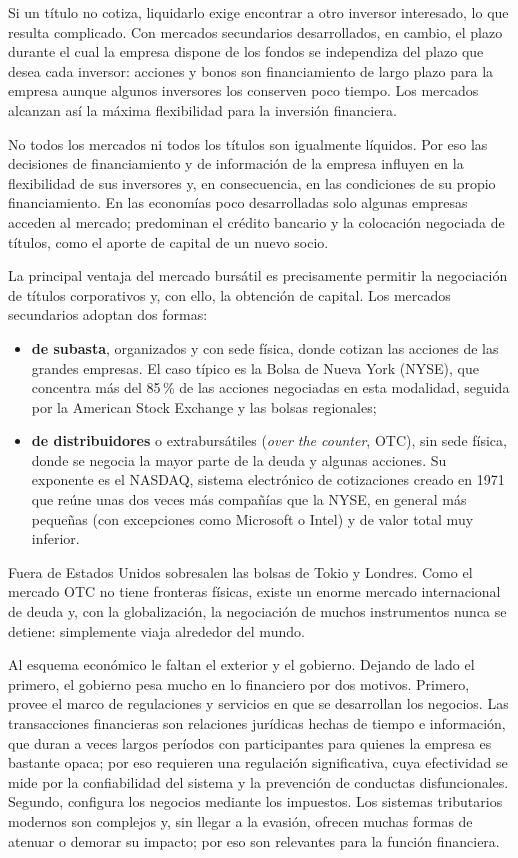 Si un título no cotiza, liquidarlo exige encontrar a otro inversor interesado, lo que resulta complicado. Con mercados secundarios desarrollados, en cambio, el plazo durante el cual la empresa dispone de los fondos se independiza del plazo que desea cada inversor: acciones y bonos son financiamiento de largo plazo para la empresa aunque algunos inversores los conserven poco tiempo. Los mercados alcanzan así la máxima flexibilidad para la inversión financiera.

No todos los mercados ni todos los títulos son igualmente líquidos. Por eso las decisiones de financiamiento y de información de la empresa influyen en la flexibilidad de sus inversores y, en consecuencia, en las condiciones de su propio financiamiento. En las economías poco desarrolladas solo algunas empresas acceden al mercado; predominan el crédito bancario y la colocación negociada de títulos, como el aporte de capital de un nuevo socio.

La principal ventaja del mercado bursátil es precisamente permitir la negociación de títulos corporativos y, con ello, la obtención de capital. Los mercados secundarios adoptan dos formas:
\begin{itemize}
\item \textbf{de subasta}, organizados y con sede física, donde cotizan las acciones de las grandes empresas. El caso típico es la Bolsa de Nueva York (NYSE), que concentra más del 85\,\% de las acciones negociadas en esta modalidad, seguida por la American Stock Exchange y las bolsas regionales;
\item \textbf{de distribuidores} o extrabursátiles (\emph{over the counter}, OTC), sin sede física, donde se negocia la mayor parte de la deuda y algunas acciones. Su exponente es el NASDAQ, sistema electrónico de cotizaciones creado en 1971 que reúne unas dos veces más compañías que la NYSE, en general más pequeñas (con excepciones como Microsoft o Intel) y de valor total muy inferior.
\end{itemize}
Fuera de Estados Unidos sobresalen las bolsas de Tokio y Londres. Como el mercado OTC no tiene fronteras físicas, existe un enorme mercado internacional de deuda y, con la globalización, la negociación de muchos instrumentos nunca se detiene: simplemente viaja alrededor del mundo.

Al esquema económico le faltan el exterior y el gobierno. Dejando de lado el primero, el gobierno pesa mucho en lo financiero por dos motivos. Primero, provee el marco de regulaciones y servicios en que se desarrollan los negocios. Las transacciones financieras son relaciones jurídicas hechas de tiempo e información, que duran a veces largos períodos con participantes para quienes la empresa es bastante opaca; por eso requieren una regulación significativa, cuya efectividad se mide por la confiabilidad del sistema y la prevención de conductas disfuncionales. Segundo, configura los negocios mediante los impuestos. Los sistemas tributarios modernos son complejos y, sin llegar a la evasión, ofrecen muchas formas de atenuar o demorar su impacto; por eso son relevantes para la función financiera.

